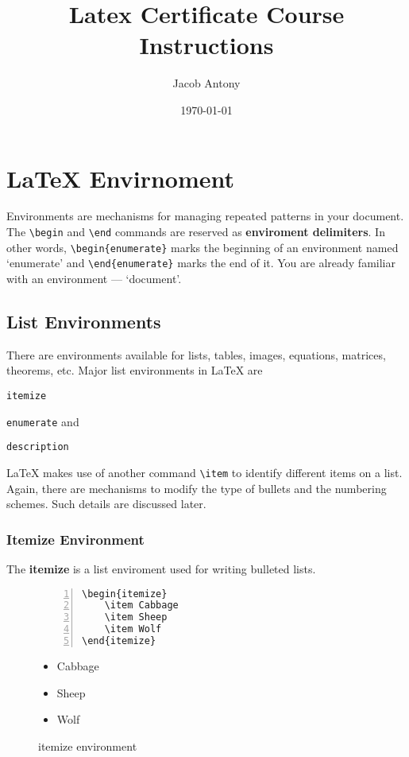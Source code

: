 \documentclass{article}
\title{Latex Certificate Course Instructions}
\author{Jacob Antony}
\date{\today}
\begin{document}
\maketitle

\section{\LaTeX{} Envirnoment}
Environments are mechanisms for managing repeated patterns in your document. The \texttt{\textbackslash begin} and \texttt{\textbackslash end} commands are reserved as \textbf{enviroment delimiters}. In other words, \texttt{\textbackslash begin\{enumerate\}} marks the beginning of an environment named `enumerate' and \texttt{\textbackslash end\{enumerate\}} marks the end of it. You are already familiar with an environment --- `document'.

\subsection{List Environments}
There are environments available for lists, tables, images, equations, matrices, theorems, etc. Major list environments in \LaTeX{} are
\begin{enumerate*}
	\item \texttt{itemize}
	\item \texttt{enumerate} and
	\item \texttt{description}
\end{enumerate*}

 \LaTeX{} makes use of another command \texttt{\textbackslash item} to identify different items on a list. Again, there are mechanisms to modify the type of bullets and the numbering schemes. Such details are discussed later.

\subsubsection{Itemize Environment}
The \textbf{itemize} is a list enviroment used for writing bulleted lists.
\begin{figure}[h]
\centering
\begin{minipage}{0.45\textwidth}
\begin{Verbatim}[numbers = left]
\begin{itemize}
	\item Cabbage
	\item Sheep
	\item Wolf
\end{itemize}
\end{Verbatim}
\end{minipage}
\begin{minipage}{0.45\textwidth}
\begin{itemize}
	\item Cabbage
	\item Sheep
	\item Wolf
\end{itemize}
\end{minipage}
\caption{itemize environment}
\end{figure}
\end{document}
